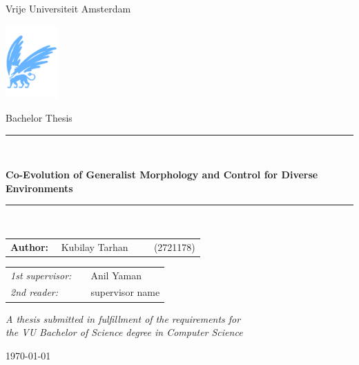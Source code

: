 \documentclass[11pt]{article}
\begin{document}
\thispagestyle{empty}

\begin{center}

      Vrije Universiteit Amsterdam

      \vspace{1mm}

      \includegraphics[height=28mm]{./resources/vu-griffioen.pdf}

      \vspace{1.5cm}

      {\Large Bachelor Thesis}

      \vspace*{1.5cm}

      \rule{.9\linewidth}{.6pt}\\[0.4cm]
      {\huge \bfseries Co-Evolution of Generalist Morphology and Control for Diverse Environments\par}
      \vspace{0.4cm}
      \rule{.9\linewidth}{.6pt}\\[1.5cm]

      \vspace*{2mm}

      {\Large
            \begin{tabular}{l}
                  {\bf Author:} ~~Kubilay Tarhan ~~~~ (2721178)
            \end{tabular}
      }

      \vspace*{1.5cm}

      \begin{tabular}{ll}
            {\it 1st supervisor:}   & ~~Anil Yaman                               \\
            {\it 2nd reader:}       & ~~supervisor name
      \end{tabular}

      \vspace*{2cm}

      \textit{A thesis submitted in fulfillment of the requirements for\\ the VU Bachelor of Science degree in Computer Science }

      \vspace*{1cm}

      \today\\[4cm] %

\end{center}










\printbibliography
\end{document}
